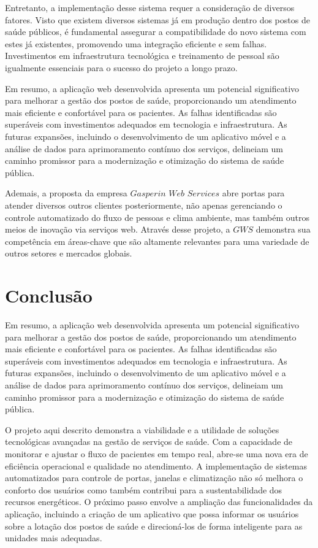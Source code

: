 \documentclass[conference, a4paper, 12pt]{IEEEtran}
\begin{document}
  Entretanto, a implementação desse sistema requer a consideração de diversos fatores. Visto que existem diversos sistemas já em produção dentro dos postos de saúde públicos, é fundamental assegurar a compatibilidade do novo sistema com estes já existentes, promovendo uma integração eficiente e sem falhas. Investimentos em infraestrutura tecnológica e treinamento de pessoal são igualmente essenciais para o sucesso do projeto a longo prazo.

  Em resumo, a aplicação web desenvolvida apresenta um potencial significativo para melhorar a gestão dos postos de saúde, proporcionando um atendimento mais eficiente e confortável para os pacientes. As falhas identificadas são superáveis com investimentos adequados em tecnologia e infraestrutura. As futuras expansões, incluindo o desenvolvimento de um aplicativo móvel e a análise de dados para aprimoramento contínuo dos serviços, delineiam um caminho promissor para a modernização e otimização do sistema de saúde pública.

  Ademais, a proposta da empresa $Gasperin$ $Web$ $Services$ abre portas para atender diversos outros clientes posteriormente, não apenas gerenciando o controle automatizado do fluxo de pessoas e clima ambiente, mas também outros meios de inovação via serviços web. Através desse projeto, a $GWS$ demonstra sua competência em áreas-chave que são altamente relevantes para uma variedade de outros setores e mercados globais. 

\section{Conclusão}
\label{sec:conclusion}

  Em resumo, a aplicação web desenvolvida apresenta um potencial significativo para melhorar a gestão dos postos de saúde, proporcionando um atendimento mais eficiente e confortável para os pacientes. As falhas identificadas são superáveis com investimentos adequados em tecnologia e infraestrutura. As futuras expansões, incluindo o desenvolvimento de um aplicativo móvel e a análise de dados para aprimoramento contínuo dos serviços, delineiam um caminho promissor para a modernização e otimização do sistema de saúde pública.

  O projeto aqui descrito demonstra a viabilidade e a utilidade de soluções tecnológicas avançadas na gestão de serviços de saúde. Com a capacidade de monitorar e ajustar o fluxo de pacientes em tempo real, abre-se uma nova era de eficiência operacional e qualidade no atendimento. A implementação de sistemas automatizados para controle de portas, janelas e climatização não só melhora o conforto dos usuários como também contribui para a sustentabilidade dos recursos energéticos. O próximo passo envolve a ampliação das funcionalidades da aplicação, incluindo a criação de um aplicativo que possa informar os usuários sobre a lotação dos postos de saúde e direcioná-los de forma inteligente para as unidades mais adequadas.
\end{document}

